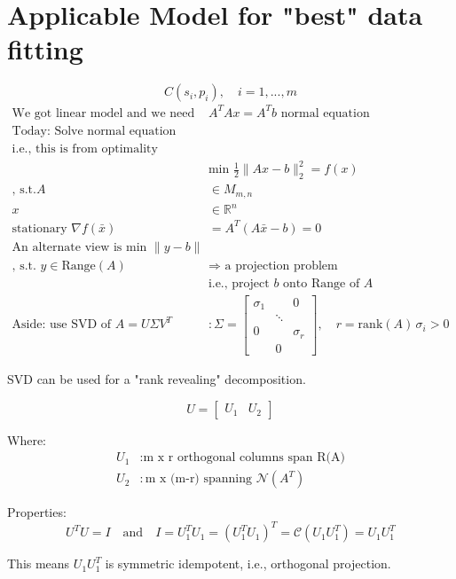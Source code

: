 \section*{Applicable Model for "best" data fitting}
\[ C(s_i, p_i), \quad i = 1,...,m \]
\begin{align*}
\text{We got linear model and we need to solve } & A^T A x = A^T b \text{ normal equation} \\
\text{Today: Solve normal equation (whenever case)} \\
\text{i.e., this is from optimality condition for } \\ 
& \text{min } \frac{1}{2}\|Ax-b\|_2^2 = f(x) \\ \text{, s.t.} 
A & \in M_{m,n} \\
x & \in \mathbb{R}^n \\
\text{stationary } \nabla f(\bar{x}) & = A^T(A\bar{x}-b) = 0 \\
\text{An alternate view is min } \|y-b\| & \\ \text{, s.t. } y \in \text{Range}(A) 
& \Rightarrow \text{ a projection problem} \\
& \text{i.e., project } b \text{ onto Range of } A \\
\text{Aside: use SVD of } A=U\Sigma V^T & : \Sigma = \begin{bmatrix}
\sigma_1 & & 0 \\
& \ddots & \\
0 & & \sigma_r \\
& 0 &
\end{bmatrix}, \quad r = \text{rank}(A)\, \sigma_i >0
\end{align*}





SVD can be used for a "rank revealing" decomposition.

\[
U = \begin{bmatrix} U_1 & U_2 \end{bmatrix}
\]

Where:
\begin{align*}
U_1 & : \text{m x r orthogonal columns span R(A)} \\
U_2 & : \text{m x (m-r) spanning } \mathcal{N}(A^T)
\end{align*}

Properties:
\[
U^TU = I \quad \text{and} \quad I= U_1^TU_1 =( U_1^TU_1)^T = \mathcal{C}(U_1U_1^T) = U_1U_1^T
\]

This means $U_1U_1^T$ is symmetric idempotent, i.e., orthogonal projection.

